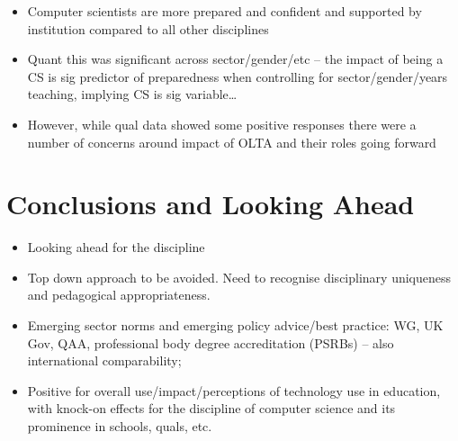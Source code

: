 \documentclass[sigconf]{acmart}
\begin{document}
\begin{itemize}
\item Computer scientists are more prepared and confident and
supported by institution compared to all other disciplines
\item Quant this was significant across sector/gender/etc – the impact
of being a CS is sig predictor of preparedness when controlling for
sector/gender/years teaching, implying CS is sig variable…
\item However, while qual data showed some positive responses there
were a number of concerns around impact of OLTA and their roles going
forward
\end{itemize}

\section{Conclusions and Looking Ahead}\label{conclusions}

\begin{itemize}
\item Looking ahead for the discipline
\item Top down approach to be avoided. Need to recognise disciplinary
uniqueness and pedagogical appropriateness.
\item Emerging sector norms and emerging policy advice/best practice:
WG, UK Gov, QAA, professional body degree accreditation (PSRBs) – also
international comparability;
\item Positive for overall use/impact/perceptions of technology use in
education, with knock-on effects for the discipline of computer
science and its prominence in schools, quals, etc.
\end{itemize}





\end{document}
